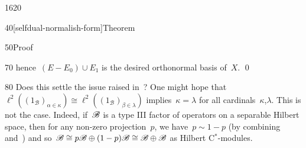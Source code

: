 \begin{parsec}{1620}
\begin{point}{40}[selfdual-normalish-form]{Theorem}
\begin{point}{50}{Proof}
\begin{point}{70}
    hence~$(E - E_0) \cup E_1$ is the desired orthonormal basis of~$X$. \qed
\end{point}
\end{point}
\end{point}
\begin{point}{80}%
Does this settle the issue raised
        in~?
      One might hope
    that~$\ell^2((1_{\mathscr{B}})_{\alpha \in \kappa}) \cong
        \ell^2((1_{\mathscr{B}})_{\beta\in\lambda})$
    implies~$\kappa=\lambda$ for all cardinals~$\kappa$,$\lambda$.
This is not the case.
Indeed, if~$\mathscr{B}$ is a type III factor
    of operators on a separable Hilbert space,
    then for any non-zero projection~$p$,
    we have~$p \sim 1 -p$ (by combining~\cite[dfn.~6.5.1]{kr}
        and~\cite[cor.~6.3.5]{kr})
    and so~$\mathscr{B} \cong p\mathscr{B} \oplus (1-p)\mathscr{B} \cong 
    \mathscr{B} \oplus \mathscr{B}$ as Hilbert C$^*$-modules.
\end{point}
\end{parsec}

